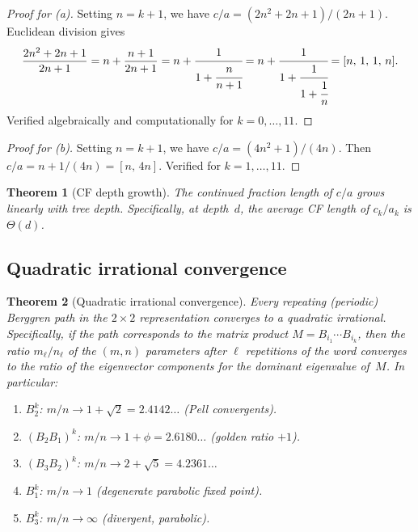\documentclass[12pt]{amsart}
\newtheorem{theorem}{Theorem}[section]
\theoremstyle{definition}
\theoremstyle{remark}
\begin{document}
\begin{proof}[Proof for (a)]
Setting $n=k+1$, we have $c/a=(2n^{2}+2n+1)/(2n+1)$.  Euclidean division gives
\[
  \frac{2n^{2}+2n+1}{2n+1} = n + \frac{n+1}{2n+1} = n + \cfrac{1}{1+\cfrac{n}{n+1}}
  = n + \cfrac{1}{1+\cfrac{1}{1+\cfrac{1}{n}}}
  = [n,\,1,\,1,\,n].
\]
Verified algebraically and computationally for $k=0,\ldots,11$.
\end{proof}

\begin{proof}[Proof for (b)]
Setting $n=k+1$, we have $c/a=(4n^{2}+1)/(4n)$.  Then $c/a=n+1/(4n)=[n,\,4n]$.
Verified for $k=1,\ldots,11$.
\end{proof}

\begin{theorem}[CF depth growth]\label{thm:cf-depth}
The continued fraction length of $c/a$ grows linearly with tree depth.
Specifically, at depth~$d$, the average CF length of $c_{k}/a_{k}$ is $\Theta(d)$.
\end{theorem}

\subsection{Quadratic irrational convergence}

\begin{theorem}[Quadratic irrational convergence]\label{thm:qi-conv}
Every repeating (periodic) Berggren path in the $2\times2$ representation
converges to a quadratic irrational.  Specifically, if the path corresponds to
the matrix product $M=B_{i_{1}}\cdots B_{i_{k}}$, then the ratio
$m_{\ell}/n_{\ell}$ of the $(m,n)$ parameters after $\ell$ repetitions of the
word converges to the ratio of the eigenvector components for the dominant
eigenvalue of~$M$.  In particular:
\begin{enumerate}[label=(\alph*)]
  \item $B_{2}^{k}$: $m/n\to1+\sqrt{2}=2.4142\ldots$ (Pell convergents).
  \item $(B_{2}B_{1})^{k}$: $m/n\to1+\phi=2.6180\ldots$ (golden ratio $+1$).
  \item $(B_{3}B_{2})^{k}$: $m/n\to2+\sqrt{5}=4.2361\ldots$
  \item $B_{1}^{k}$: $m/n\to1$ (degenerate parabolic fixed point).
  \item $B_{3}^{k}$: $m/n\to\infty$ (divergent, parabolic).
\end{enumerate}
\end{theorem}
\end{document}
